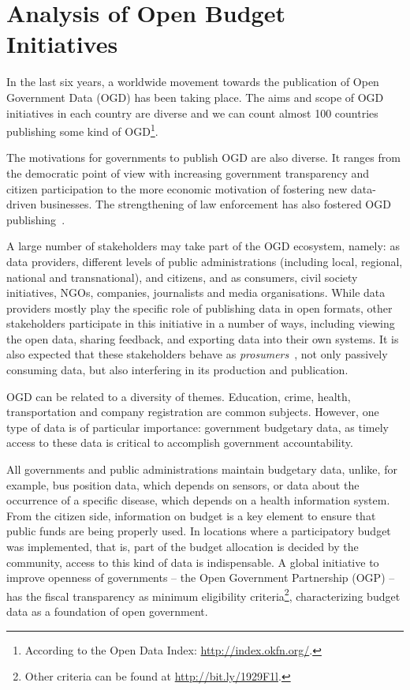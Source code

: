 \chapter{Analysis of Open Budget Initiatives}
\label{chap:openbudget}
In the last six years, a worldwide movement towards the publication of Open Government Data (OGD) has been taking place. 
The aims and scope of OGD initiatives in each country are diverse and we can count almost 100 countries publishing some kind of OGD\footnote{According to the Open Data Index: \url{http://index.okfn.org/}.}. 

The motivations for governments to publish OGD are also diverse.
It ranges from the democratic point of view with increasing government transparency and citizen participation to the more economic motivation of fostering new data-driven businesses. 
The strengthening of law enforcement has also fostered OGD publishing~\cite{Huijboom2011}.

A large number of stakeholders may take part of the OGD ecosystem, namely: as data providers, different levels of public administrations (including local, regional, national and transnational), and citizens, and as consumers, civil society initiatives, NGOs, companies, journalists and media organisations. 
While data providers mostly play the specific role of publishing data in open formats, other stakeholders participate in this initiative in a number of ways, including viewing the open data, sharing feedback, and exporting data into their own systems.
It is also expected that these stakeholders behave as \emph{prosumers}~\cite{Alexopoulos2014}, not only passively consuming data, but also interfering in its production and publication.

OGD can be related to a diversity of themes. 
Education, crime, health, transportation and company registration are common subjects. 
However, one type of data is of particular importance: government budgetary data, as timely access to these data is critical to accomplish government accountability.   

All governments and public administrations maintain budgetary data, unlike, for example, bus position data, which depends on sensors, or data about the occurrence of a specific disease, which depends on a health information system.
From the citizen side, information on budget is a key element to ensure that public funds are being properly used.
In locations where a participatory budget~\cite{Mkude2014} was implemented, that is, part of the budget allocation is decided by the community, access to this kind of data is indispensable.
A global initiative to improve openness of governments -- the Open Government Partnership (OGP) -- has the fiscal transparency as minimum eligibility criteria\footnote{Other criteria can be found at \url{http://bit.ly/1929F1l}.}, characterizing budget data as a foundation of open government.


